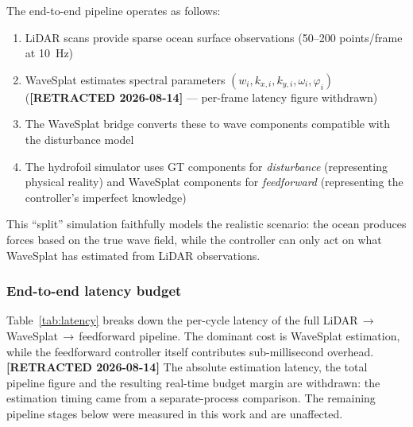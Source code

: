 \documentclass[review]{elsarticle}
\begin{document}
The end-to-end pipeline operates as follows:
\begin{enumerate}
  \item LiDAR scans provide sparse ocean surface observations
    (50--200 points/frame at 10~Hz)
  \item WaveSplat estimates spectral parameters
    $(w_i, k_{x,i}, k_{y,i}, \omega_i, \varphi_i)$
    (\textbf{[RETRACTED 2026-08-14]} --- per-frame latency figure withdrawn)
  \item The WaveSplat bridge converts these to wave components
    compatible with the disturbance model
  \item The hydrofoil simulator uses GT components for
    \emph{disturbance} (representing physical reality) and WaveSplat
    components for \emph{feedforward} (representing the controller's
    imperfect knowledge)
\end{enumerate}

This ``split'' simulation faithfully models the realistic scenario:
the ocean produces forces based on the true wave field, while the
controller can only act on what WaveSplat has estimated from
LiDAR observations.

\subsubsection*{End-to-end latency budget}

Table~\ref{tab:latency} breaks down the per-cycle latency of the
full LiDAR$\,\to\,$WaveSplat$\,\to\,$feedforward pipeline.
The dominant cost is WaveSplat estimation, while the
feedforward controller itself contributes sub-millisecond overhead.
\textbf{[RETRACTED 2026-08-14]} The absolute estimation latency, the total
pipeline figure and the resulting real-time budget margin are withdrawn: the
estimation timing came from a separate-process comparison. The remaining
pipeline stages below were measured in this work and are unaffected.
\end{document}
